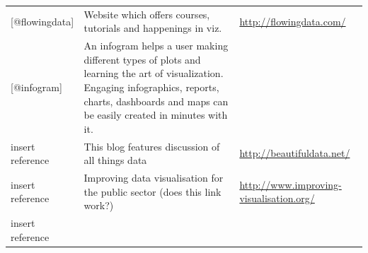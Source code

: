 \documentclass[]{book}
\theoremstyle{definition}
\theoremstyle{definition}
\theoremstyle{definition}
\theoremstyle{remark}
\begin{document}
\begin{longtable}[]{@{}lll@{}}
\begin{minipage}[t]{0.15\columnwidth}
{[}@flowingdata{]}\strut
\end{minipage} & \begin{minipage}[t]{0.28\columnwidth}\raggedright\strut
Website which offers courses, tutorials and happenings in viz.\strut
\end{minipage} & \begin{minipage}[t]{0.48\columnwidth}\raggedright\strut
\url{http://flowingdata.com/}\strut
\end{minipage}\tabularnewline
\begin{minipage}[t]{0.15\columnwidth}\raggedright\strut
{[}@infogram{]}\strut
\end{minipage} & \begin{minipage}[t]{0.28\columnwidth}\raggedright\strut
An infogram helps a user making different types of plots and learning
the art of visualization. Engaging infographics, reports, charts,
dashboards and maps can be easily created in minutes with it.\strut
\end{minipage} & \begin{minipage}[t]{0.48\columnwidth}\raggedright\strut
\strut
\end{minipage}\tabularnewline
\begin{minipage}[t]{0.15\columnwidth}\raggedright\strut
insert reference\strut
\end{minipage} & \begin{minipage}[t]{0.28\columnwidth}\raggedright\strut
This blog features discussion of all things data\strut
\end{minipage} & \begin{minipage}[t]{0.48\columnwidth}\raggedright\strut
\url{http://beautifuldata.net/}\strut
\end{minipage}\tabularnewline
\begin{minipage}[t]{0.15\columnwidth}\raggedright\strut
insert reference\strut
\end{minipage} & \begin{minipage}[t]{0.28\columnwidth}\raggedright\strut
Improving data visualisation for the public sector (does this link
work?)\strut
\end{minipage} & \begin{minipage}[t]{0.48\columnwidth}\raggedright\strut
\url{http://www.improving-visualisation.org/}\strut
\end{minipage}\tabularnewline
\begin{minipage}[t]{0.15\columnwidth}\raggedright\strut
insert reference\strut
\end{minipage} & \begin{minipage}[t]{0.28\columnwidth}\raggedright\strut

\end{minipage}
\end{longtable}
\end{document}
